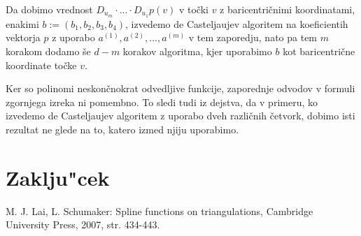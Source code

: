 \documentclass[12pt,a4paper]{amsart}
\theoremstyle{definition} %
\theoremstyle{plain} %
\begin{document}
Da dobimo vrednost $D_{u_m}\cdot ... \cdot D_{u_1}p(v)$
v točki $v$ z baricentričnimi koordinatami, enakimi 
$b := (b_1,b_2,b_3,b_4)$, izvedemo de Casteljaujev 
algoritem na koeficientih vektorja $p$ z uporabo 
$a^{(1)},a^{(2)},...,a^{(m)}$ v tem zaporedju,
nato pa tem $m$ korakom dodamo še 
$d-m$ korakov algoritma, kjer uporabimo $b$ kot 
baricentrične koordinate točke $v$.


Ker so polinomi neskončnokrat odvedljive funkcije, 
zaporednje odvodov v formuli zgornjega izreka ni pomembno.
To sledi tudi iz dejstva, da v primeru, ko izvedemo 
de Casteljaujev algoritem z uporabo dveh različnih četvork, 
dobimo isti rezultat ne glede na to, katero izmed njiju uporabimo.

\section{Zaklju"cek}

\begin{thebibliography}{99}
   M. J. Lai, L. Schumaker: Spline functions on triangulations, Cambridge University Press, 2007, str. 434-443.

\end{thebibliography}
\end{document}

